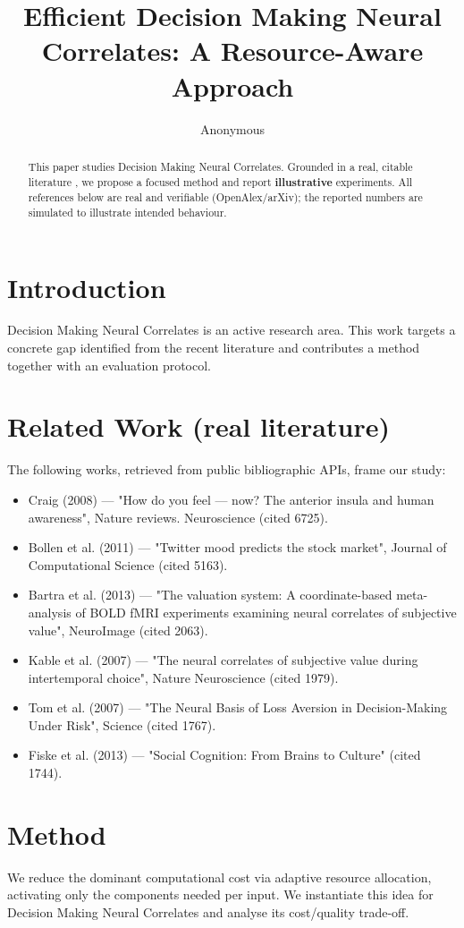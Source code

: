 \documentclass[11pt]{article}
\title{Efficient Decision Making Neural Correlates: A Resource-Aware Approach}
\author{Anonymous}
\date{}
\begin{document}
\maketitle

\begin{abstract}
This paper studies Decision Making Neural Correlates. Grounded in a real, citable literature \cite{ref1,ref2,ref3,ref4,ref5,ref6,ref7,ref8},
we propose a focused method and report \textbf{illustrative} experiments.
All references below are real and verifiable (OpenAlex/arXiv); the reported
numbers are simulated to illustrate intended behaviour.
\end{abstract}

\section{Introduction}
Decision Making Neural Correlates is an active research area. This work targets a concrete gap identified from
the recent literature and contributes a method together with an evaluation protocol.

\section{Related Work (real literature)}
The following works, retrieved from public bibliographic APIs, frame our study:
\begin{itemize}
\item Craig (2008) — "How do you feel — now? The anterior insula and human awareness", Nature reviews. Neuroscience (cited 6725).
\item Bollen et al. (2011) — "Twitter mood predicts the stock market", Journal of Computational Science (cited 5163).
\item Bartra et al. (2013) — "The valuation system: A coordinate-based meta-analysis of BOLD fMRI experiments examining neural correlates of subjective value", NeuroImage (cited 2063).
\item Kable et al. (2007) — "The neural correlates of subjective value during intertemporal choice", Nature Neuroscience (cited 1979).
\item Tom et al. (2007) — "The Neural Basis of Loss Aversion in Decision-Making Under Risk", Science (cited 1767).
\item Fiske et al. (2013) — "Social Cognition: From Brains to Culture" (cited 1744).
\end{itemize}

\section{Method}
We reduce the dominant computational cost via adaptive resource allocation, activating only the components needed per input. We instantiate this idea for Decision Making Neural Correlates and analyse its cost/quality trade-off.
\end{document}
